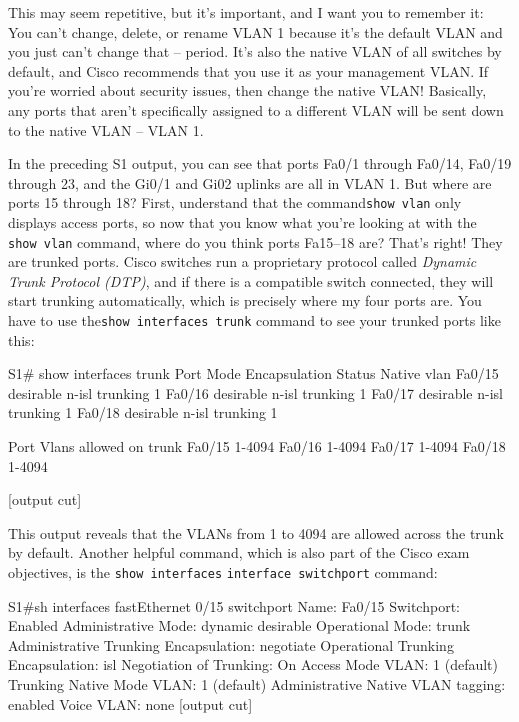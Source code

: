 This may seem repetitive, but it's important, and I want you to remember
it: You can't change, delete, or rename VLAN 1 because it's the default
VLAN and you just can't change that -- period. It's also the native VLAN
of all switches by default, and Cisco recommends that you use it as your
management VLAN. If you're worried about security issues, then change
the native VLAN! Basically, any ports that aren't specifically assigned
to a different VLAN will be sent down to the native VLAN -- VLAN 1.

In the preceding S1 output, you can see that ports Fa0/1 through Fa0/14,
Fa0/19 through 23, and the Gi0/1 and Gi02 uplinks are all in VLAN 1. But
where are ports 15 through 18? First, understand that the
command\texttt{show\ vlan} only displays access ports, so now that you
know what you're looking at with the \texttt{show\ vlan} command, where
do you think ports Fa15--18 are? That's right! They are trunked ports.
Cisco switches run a proprietary protocol called \emph{Dynamic Trunk
Protocol (DTP)}, and if there is a compatible switch connected, they
will start trunking automatically, which is precisely where my four
ports are. You have to use the\texttt{show\ interfaces\ trunk} command
to see your trunked ports like this:

\begin{cli}
S1# show interfaces trunk
Port        Mode             Encapsulation  Status        Native vlan
Fa0/15      desirable        n-isl          trunking      1
Fa0/16      desirable        n-isl          trunking      1
Fa0/17      desirable        n-isl          trunking      1
Fa0/18      desirable        n-isl          trunking      1
 
Port        Vlans allowed on trunk
Fa0/15      1-4094
Fa0/16      1-4094
Fa0/17      1-4094
Fa0/18      1-4094
 
[output cut]
\end{cli}

This output reveals that the VLANs from 1 to 4094 are allowed across the trunk by default.
Another helpful command, which is also part of the Cisco exam
objectives, is the \texttt{show\ interfaces}
\texttt{interface}\texttt{\ switchport} command:

\begin{cli}
S1#sh interfaces fastEthernet 0/15 switchport
Name: Fa0/15
Switchport: Enabled
Administrative Mode: dynamic desirable
Operational Mode: trunk
Administrative Trunking Encapsulation: negotiate
Operational Trunking Encapsulation: isl
Negotiation of Trunking: On
Access Mode VLAN: 1 (default)
Trunking Native Mode VLAN: 1 (default)
Administrative Native VLAN tagging: enabled
Voice VLAN: none
[output cut]
\end{cli}

